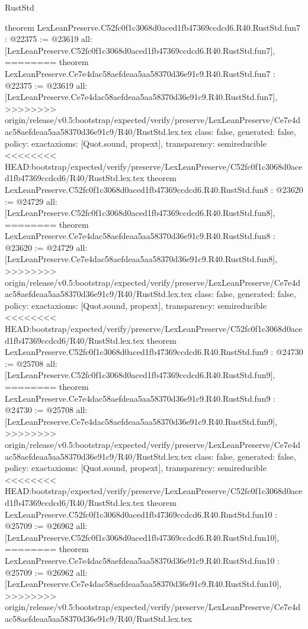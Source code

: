 \begin{lexlean}{RustStd}
\begin{coremodule}
{\begin{coremodule}
{{{{{{{{{theorem LexLeanPreserve.C52fc0f1c3068d0aced1fb47369ccdcd6.R40.RustStd.fun7 : @22375 := @23619 {
  all: [LexLeanPreserve.C52fc0f1c3068d0aced1fb47369ccdcd6.R40.RustStd.fun7],
========
theorem LexLeanPreserve.Ce7e4dac58aefdeaa5aa58370d36e91c9.R40.RustStd.fun7 : @22375 := @23619 {
  all: [LexLeanPreserve.Ce7e4dac58aefdeaa5aa58370d36e91c9.R40.RustStd.fun7],
>>>>>>>> origin/release/v0.5:bootstrap/expected/verify/preserve/LexLeanPreserve/Ce7e4dac58aefdeaa5aa58370d36e91c9/R40/RustStd.lex.tex
  class: false,
  generated: false,
  policy: exact{axioms: [Quot.sound, propext]},
  transparency: semireducible
}
<<<<<<<< HEAD:bootstrap/expected/verify/preserve/LexLeanPreserve/C52fc0f1c3068d0aced1fb47369ccdcd6/R40/RustStd.lex.tex
theorem LexLeanPreserve.C52fc0f1c3068d0aced1fb47369ccdcd6.R40.RustStd.fun8 : @23620 := @24729 {
  all: [LexLeanPreserve.C52fc0f1c3068d0aced1fb47369ccdcd6.R40.RustStd.fun8],
========
theorem LexLeanPreserve.Ce7e4dac58aefdeaa5aa58370d36e91c9.R40.RustStd.fun8 : @23620 := @24729 {
  all: [LexLeanPreserve.Ce7e4dac58aefdeaa5aa58370d36e91c9.R40.RustStd.fun8],
>>>>>>>> origin/release/v0.5:bootstrap/expected/verify/preserve/LexLeanPreserve/Ce7e4dac58aefdeaa5aa58370d36e91c9/R40/RustStd.lex.tex
  class: false,
  generated: false,
  policy: exact{axioms: [Quot.sound, propext]},
  transparency: semireducible
}
<<<<<<<< HEAD:bootstrap/expected/verify/preserve/LexLeanPreserve/C52fc0f1c3068d0aced1fb47369ccdcd6/R40/RustStd.lex.tex
theorem LexLeanPreserve.C52fc0f1c3068d0aced1fb47369ccdcd6.R40.RustStd.fun9 : @24730 := @25708 {
  all: [LexLeanPreserve.C52fc0f1c3068d0aced1fb47369ccdcd6.R40.RustStd.fun9],
========
theorem LexLeanPreserve.Ce7e4dac58aefdeaa5aa58370d36e91c9.R40.RustStd.fun9 : @24730 := @25708 {
  all: [LexLeanPreserve.Ce7e4dac58aefdeaa5aa58370d36e91c9.R40.RustStd.fun9],
>>>>>>>> origin/release/v0.5:bootstrap/expected/verify/preserve/LexLeanPreserve/Ce7e4dac58aefdeaa5aa58370d36e91c9/R40/RustStd.lex.tex
  class: false,
  generated: false,
  policy: exact{axioms: [Quot.sound, propext]},
  transparency: semireducible
}
<<<<<<<< HEAD:bootstrap/expected/verify/preserve/LexLeanPreserve/C52fc0f1c3068d0aced1fb47369ccdcd6/R40/RustStd.lex.tex
theorem LexLeanPreserve.C52fc0f1c3068d0aced1fb47369ccdcd6.R40.RustStd.fun10 : @25709 := @26962 {
  all: [LexLeanPreserve.C52fc0f1c3068d0aced1fb47369ccdcd6.R40.RustStd.fun10],
========
theorem LexLeanPreserve.Ce7e4dac58aefdeaa5aa58370d36e91c9.R40.RustStd.fun10 : @25709 := @26962 {
  all: [LexLeanPreserve.Ce7e4dac58aefdeaa5aa58370d36e91c9.R40.RustStd.fun10],
>>>>>>>> origin/release/v0.5:bootstrap/expected/verify/preserve/LexLeanPreserve/Ce7e4dac58aefdeaa5aa58370d36e91c9/R40/RustStd.lex.tex
}}}}}}}}}}}}}}
\end{coremodule}}
\end{coremodule}
\end{lexlean}
